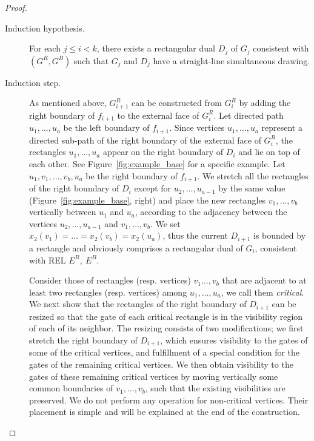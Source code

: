 \documentclass{llncs}
\begin{document}
\begin{proof}
\begin{description}
\item[Induction hypothesis.] For each $j\leq i<k$, there exists a rectangular dual $D_j$ of $G_j$ consistent with $(G^R, G^B)$ such that $G_j$ and $D_j$ have a straight-line simultaneous drawing.

\item[Induction step.] As mentioned above, $G^R_{i+1}$  can be constructed from $G^R_i$ by adding the right boundary of $f_{i+1}$ to the external face of $G^R_i$. Let directed path $u_1,\dots,u_a$ be the left boundary of $f_{i+1}$. Since vertices $u_1,\dots,u_a$ represent a directed sub-path of the right boundary of the external face of $G_i^R$, the rectangles $u_1,\dots,u_a$ appear on the right boundary of $D_i$ and lie on top of each other. See Figure~\ref{fig:example_base} for a specific example.  Let $u_1,v_1,\dots,v_b,u_a$ be the right boundary of $f_{i+1}$. We stretch all the rectangles of the right boundary of $D_i$ except for $u_2,\dots,u_{a-1}$ by the same value (Figure~\ref{fig:example_base}, right) and place the new rectangles  $v_1,\dots,v_b$ vertically between $u_1$ and $u_a$, according to the adjacency between the vertices $u_2,\dots,u_{a-1}$ and $v_1,\dots,v_b$. We set $x_2(v_1)=\dots=x_2(v_b) = x_2(u_a)$, thus the current $D_{i+1}$ is bounded by a rectangle and obviously comprises a rectangular dual of $G_i$, consistent with REL $E^R,~E^B$. 

Consider those of rectangles (resp. vertices) $v_1\dots,v_b$ that are adjacent to at least two rectangles (resp. vertices) among $u_1,\dots, u_a$, we call them \emph{critical}.   We next show that the rectangles of the right boundary of $D_{i+1}$ can be resized so that the gate of each critical rectangle is in the visibility region of each of its neighbor.  The resizing consists of two modifications; we first stretch the right boundary of $D_{i+1}$, which ensures visibility to the gates of some of the critical vertices, and fulfillment of a special condition for the gates of the remaining critical vertices. We then obtain visibility to the gates of these remaining critical vertices by moving vertically some common boundaries of $v_1,\dots,v_b$, such that the existing visibilities are preserved.  We do not perform any operation for non-critical vertices. Their placement is simple and will be explained at the end of the construction.


\end{description}
\end{proof}
\end{document}
